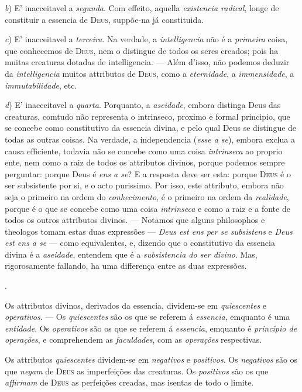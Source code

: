 {\emph{b}) E' inacceitavel a \emph{segunda}. Com effeito, aquella \emph{existencia
radical}, longe de constituir a essencia de \textsc{Deus}, suppõe-na já constituida.

\emph{c}) E' inacceitavel a \emph{terceira}. Na verdade, a \emph{intelligencia} não é a
\emph{primeira} coisa, que conhecemos de \textsc{Deus}, nem o distingue de todos os seres
creados; pois ha muitas creaturas dotadas de intelligencia. --- Além d'isso, não podemos
deduzir da \emph{intelligencia} muitos attributos de \textsc{Deus}, como a
\emph{eternidade}, a \emph{immensidade}, a \emph{immutabilidade}, etc.

\emph{d}) E' inacceitavel a \emph{quarta}. Porquanto, a \emph{aseidade}, embora distinga
Deus das creaturas, comtudo não representa o intrinseco, proximo e formal principio, que
se concebe como constitutivo da essencia divina, e pelo qual Deus se distingue de todas
as outras coisas. Na verdade, a independencia (\emph{esse a se}), embora exclua a causa
efficiente, todavia não se concebe como uma coisa \emph{intrinseca} ao proprio ente, nem
como a raiz de todos os attributos divinos, porque podemos sempre perguntar: porque Deus é
\emph{ens a se}? E a resposta deve ser esta: porque \textsc{Deus} é o ser subsistente por
si, e o acto purissimo. Por isso, este attributo, embora não seja o primeiro na ordem do
\emph{conhecimento}, é o primeiro na ordem da \emph{realidade}, porque é o que se concebe
como uma coisa \emph{intrinseca} e como a raiz e a fonte de todos os outros attributos
divinos. --- Notamos que alguns philosophos e theologos tomam estas duas expressões ---
\emph{Deus est ens per se subsistens} e \emph{Deus est ens a se} --- como equivalentes,
e, dizendo que o constitutivo da essencia divina é a \emph{aseidade}, entendem que é a
\emph{subsistencia do ser divino}. Mas, rigorosamente fallando, ha uma differença entre
as duas expressões.}.

 Os attributos
divinos, derivados da essencia, dividem-se em \emph{quiescentes} e \emph{operativos}. ---
Os \emph{quiescentes} são os que se referem á \emph{essencia}, emquanto é uma
\emph{entidade}. Os \emph{operativos} são os que se referem á \emph{essencia}, emquanto é
\emph{principio de operações}, e comprehendem as \emph{faculdades}, com as
\emph{operações} respectivas.

Os attributos \emph{quiescentes} dividem-se em \emph{negativos} e \emph{positivos}.
Os \emph{negativos} são os que \emph{negam} de \textsc{Deus} as imperfeições das
creaturas. Os \emph{positivos} são os que \emph{affirmam} de \textsc{Deus} as perfeições
creadas, mas isentas de todo o limite.

